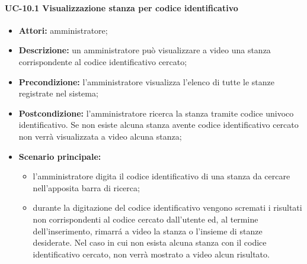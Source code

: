 \paragraph{UC-10.1 Visualizzazione stanza per codice identificativo}
\begin{itemize}
    \item \textbf{Attori:} amministratore;
    \item \textbf{Descrizione:} un amministratore pu\`{o} visualizzare a video una stanza corrispondente al codice identificativo cercato;
    \item \textbf{Precondizione:} l'amministratore visualizza l'elenco di tutte le stanze registrate nel sistema;
    \item \textbf{Postcondizione:} l'amministratore ricerca la stanza tramite codice univoco identificativo. Se non esiste alcuna stanza avente codice identificativo cercato non verrà visualizzata a video alcuna stanza;
    \item \textbf{Scenario principale:}
    \begin{itemize}
        \item l'amministratore digita il codice identificativo di una stanza da cercare nell'apposita barra di ricerca;
        \item durante la digitazione del codice identificativo vengono scremati i risultati non corrispondenti al codice cercato dall'utente ed, al termine dell'inserimento, rimarr\'{a} a video la stanza o l'insieme di stanze desiderate. Nel caso in cui non esista alcuna stanza con il codice identificativo cercato, non verrà mostrato a video alcun risultato.
    \end{itemize}
\end{itemize}

